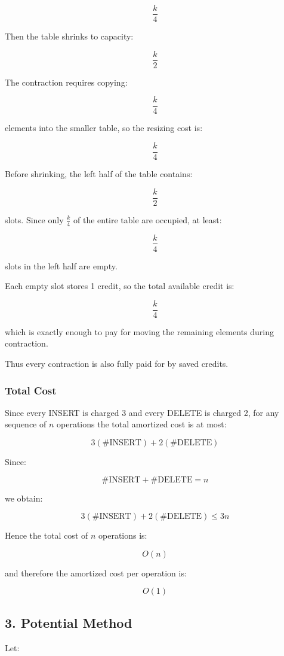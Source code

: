 \documentclass[12pt]{article}
\begin{document}
\[
\frac{k}{4}
\]

Then the table shrinks to capacity:

\[
\frac{k}{2}
\]

The contraction requires copying:

\[
\frac{k}{4}
\]

elements into the smaller table, so the resizing cost is:

\[
\frac{k}{4}
\]

Before shrinking, the left half of the table contains:

\[
\frac{k}{2}
\]

slots. Since only $\frac{k}{4}$ of the entire table are occupied, at least:

\[
\frac{k}{4}
\]

slots in the left half are empty.

Each empty slot stores 1 credit, so the total available credit is:

\[
\frac{k}{4}
\]

which is exactly enough to pay for moving the remaining elements during contraction.

Thus every contraction is also fully paid for by saved credits.

\subsubsection*{Total Cost}

Since every INSERT is charged 3 and every DELETE is charged 2, for any sequence of $n$ operations the total amortized cost is at most:

\[
3(\#\text{INSERT}) + 2(\#\text{DELETE})
\]

Since:

\[
\#\text{INSERT} + \#\text{DELETE} = n
\]

we obtain:

\[
3(\#\text{INSERT}) + 2(\#\text{DELETE}) \leq 3n
\]

Hence the total cost of $n$ operations is:

\[
O(n)
\]

and therefore the amortized cost per operation is:

\[
O(1)
\]


\subsection*{3. Potential Method}

Let:
\end{document}
